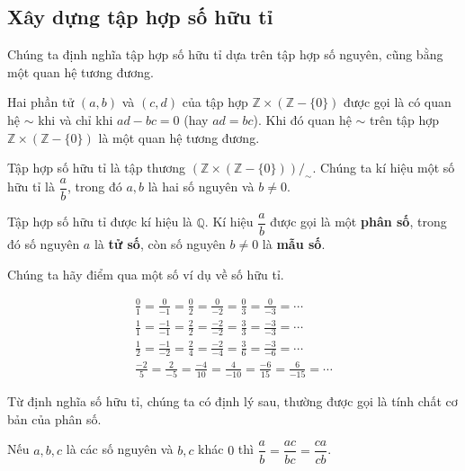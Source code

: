 \subsection{Xây dựng tập hợp số hữu tỉ}

Chúng ta định nghĩa tập hợp số hữu tỉ dựa trên tập hợp số nguyên, cũng bằng một quan hệ tương đương.
\begin{theorem}\label{theorem:equivalence-relation-in-definition-of-rational-numbers}
    Hai phần tử $(a, b)$ và $(c, d)$ của tập hợp $\mathbb{Z}\times(\mathbb{Z} - \{0\})$ được gọi là có quan hệ $\sim$ khi và chỉ khi $a d - b c = 0$ (hay $a d = b c$). Khi đó quan hệ $\sim$ trên tập hợp $\mathbb{Z}\times(\mathbb{Z} - \{0\})$ là một quan hệ tương đương.
\end{theorem}

\begin{definition}
   Tập hợp số hữu tỉ là tập thương ${(\mathbb{Z}\times (\mathbb{Z} - \{0\}))}/_{\sim}$. Chúng ta kí hiệu một số hữu tỉ là $\dfrac{a}{b}$, trong đó $a, b$ là hai số nguyên và $b\ne 0$.
   
   Tập hợp số hữu tỉ được kí hiệu là $\mathbb{Q}$. Kí hiệu $\dfrac{a}{b}$ được gọi là một \textbf{phân số}, trong đó số nguyên $a$ là \textbf{tử số}, còn số nguyên $b\ne 0$ là \textbf{mẫu số}.
\end{definition}

Chúng ta hãy điểm qua một số ví dụ về số hữu tỉ.
\begin{example}
    \begin{align*}
        \frac{0}{1} = \frac{0}{-1} = \frac{0}{2} = \frac{0}{-2} = \frac{0}{3} = \frac{0}{-3} = \cdots        \\
        \frac{1}{1} = \frac{-1}{-1} = \frac{2}{2} = \frac{-2}{-2} = \frac{3}{3} = \frac{-3}{-3} = \cdots     \\
        \frac{1}{2} = \frac{-1}{-2} = \frac{2}{4} = \frac{-2}{-4} = \frac{3}{6} = \frac{-3}{-6} = \cdots     \\
        \frac{-2}{5} = \frac{2}{-5} = \frac{-4}{10} = \frac{4}{-10} = \frac{-6}{15} = \frac{6}{-15} = \cdots
    \end{align*}
\end{example}

Từ định nghĩa số hữu tỉ, chúng ta có định lý sau, thường được gọi là tính chất cơ bản của phân số.
\begin{theorem}\label{theorem:fundamental-property-of-fraction}
    Nếu $a, b, c$ là các số nguyên và $b, c$ khác $0$ thì $\dfrac{a}{b} = \dfrac{ac}{bc} = \dfrac{ca}{cb}$.
\end{theorem}

